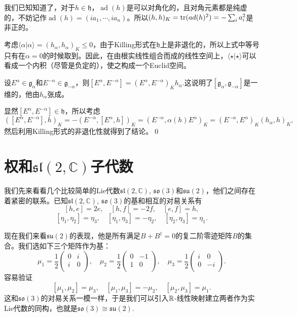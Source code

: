 \documentclass[9pt]{extarticle}
\newcommand{\cc}{\mathbb{C}}
\newcommand{\lag}{{\mathfrak{g}}}
\DeclareMathOperator{\ad}{ad}
\begin{document}
\para 我们已知知道了，对于$h\in \mathfrak{h}$，$\ad(h)$是可以对角化的，且对角元素都是纯虚的，不妨记作$\ad(h)=(ia_1,\cdots,ia_n)$。所以$(h,h)_K=\operatorname{tr}(ad(h)^2)=-\sum_i a_i^2$是非正的。

考虑$\langle \alpha|\alpha\rangle = (h_\alpha,h_\alpha)_K\leq 0$，由于Killing形式在$\mathfrak{h}$上是非退化的，所以上式中等号只有在$\alpha=0$的时候取到。因此，在由根实线性组合而成的线性空间上，$\langle \star|\star\rangle$可以看成一个内积（尽管是负定的），使之构成一个Euclid空间。

\pro 设$E^\alpha \in \lag_\alpha$和$E^{-\alpha} \in \lag_{-\alpha}$，则$[E^{\alpha},E^{-\alpha}]=(E^{\alpha},E^{-\alpha})_Kh_\alpha$.这说明了$[\lag_{\alpha},\lag_{-\alpha}]$是一维的，他由$h_\alpha$张成。

\proof 显然$[E^\alpha,E^{-\alpha}]\in \mathfrak{h}$，所以考虑
\[
	([E^\alpha,E^{-\alpha}],h)_K=-(E^{-\alpha},[E^\alpha,h])_K=(E^{-\alpha},\alpha(h)E^\alpha)_K=(E^{-\alpha},E^\alpha)_K(h_\alpha,h)_K,
\]
然后利用Killing形式的非退化性就得到了结论。\qed

\section{权和$\mathfrak{sl}(2,\cc)$子代数}

我们先来看看几个比较简单的Lie代数$\mathfrak{sl}(2,\cc)$, $\mathfrak{so}(3)$和$\mathfrak{su}(2)$，他们之间存在着紧密的联系。已知$\mathfrak{sl}(2,\cc)$, $\mathfrak{so}(3)$的基和相互的对易关系有
\[
[h,e]=2e,\quad[h,f]=-2f,\quad[e,f]=h,
\]
\[
	[\eta_1,\eta_2]=\eta_3,\quad [\eta_1,\eta_3]=-\eta_2,\quad [\eta_2,\eta_3]=\eta_1.
\]

现在我们来看$\mathfrak{su}(2)$的表现，他是所有满足$B+B^\dag=0$的复二阶零迹矩阵$B$的集合。我们选如下三个矩阵作为基：
\[
\mu_1=\frac{1}{2}\begin{pmatrix}
	0&i\\
	i&0\\
\end{pmatrix},\quad
\mu_2=\frac{1}{2}\begin{pmatrix}
	0&-1\\
	1&0\\
\end{pmatrix},\quad
\mu_3=\frac{1}{2}\begin{pmatrix}
	i&0\\
	0&-i\\
\end{pmatrix}.
\]
容易验证
\[
	[\mu_1,\mu_2]=\mu_3,\quad [\mu_1,\mu_3]=-\mu_2,\quad [\mu_2,\mu_3]=\mu_1.
\]
这和$\mathfrak{so}(3)$的对易关系一模一样，于是我们可以引入$\mathbb{R}$-线性映射建立两者作为实Lie代数的同构，也就是$\mathfrak{so}(3)\cong \mathfrak{su}(2)$.
\end{document}
